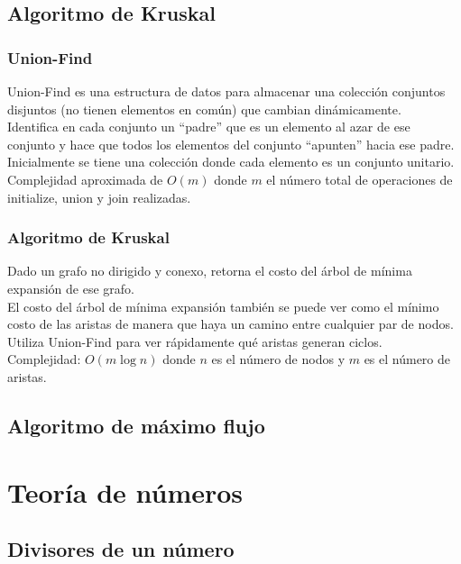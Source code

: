 \documentclass[10pt,letterpaper,twocolumn]{article}
\newcommand{\source}[1]{
	
	\dotfill
}
\begin{document}
	\subsection{Algoritmo de Kruskal}
		\subsubsection{Union-Find}
		Union-Find es una estructura de datos para almacenar una colección conjuntos disjuntos (no tienen elementos en común) que cambian dinámicamente.\\
		Identifica en cada conjunto un ``padre'' que es un elemento al azar de ese conjunto y hace que todos los elementos del conjunto ``apunten'' hacia ese padre. \\
		Inicialmente se tiene una colección donde cada elemento es un conjunto unitario.\\
		Complejidad aproximada de $O(m)$ donde $m$ el número total de operaciones de initialize, union y join realizadas.\\
		\source{./src/union-find.cpp}
		
		\subsubsection{Algoritmo de Kruskal}
		Dado un grafo no dirigido y conexo, retorna el costo del árbol de mínima expansión de ese grafo.\\
		El costo del árbol de mínima expansión también se puede ver como el mínimo costo de las aristas de manera que haya un camino entre cualquier par de nodos.\\
		Utiliza Union-Find para ver rápidamente qué aristas generan ciclos.\\
		Complejidad: $O(m\operatorname{log} n)$  donde $n$ es el número de nodos y $m$ es el número de aristas.\\
		\source{./src/kruskal.cpp}
	\subsection{Algoritmo de máximo flujo}
	
	
\section{Teoría de números}
	\subsection{Divisores de un número}
	
\end{document}
